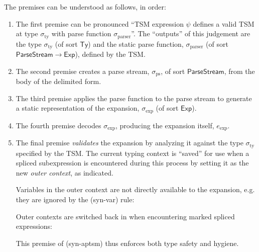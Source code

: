 The premises can be understood as follows, in order:
\begin{enumerate}
\item The first premise can be pronounced ``TSM expression $\psi$ defines a valid TSM at type $\sigma_\text{ty}$ with parse function $\sigma_\text{parser}$''.  The ``outputs'' of this judgement are the type $\sigma_\text{ty}$ (of sort $\mathsf{Ty}$) and the static parse function, $\sigma_\text{parser}$ (of sort $\mathsf{ParseStream} \rightarrow \mathsf{Exp}$), defined by the TSM.%
\item The second premise creates a parse stream, $\sigma_\text{ps}$, of sort $\mathsf{ParseStream}$, from the body of the delimited form.
\item The third premise applies the parse function to the parse stream to generate a static representation of the expansion, $\sigma_\text{exp}$ (of sort $\mathsf{Exp}$).%
\item The fourth premise decodes $\sigma_\text{exp}$, producing the expansion itself, $e_\text{exp}$.
\item The final premise \emph{validates} the expansion by analyzing it against the type $\sigma_\text{ty}$ specified by the TSM. The {current} typing context is ``saved'' for use when a spliced subexpression is encountered during this process by setting it as the new \emph{outer context}, as indicated.

Variables in the outer context are not directly available to the expansion, e.g. they are ignored by the (syn-var) rule:
\begin{mathpar}
\end{mathpar}

Outer contexts are switched back in when encountering marked spliced expressions:
\begin{mathpar}

\end{mathpar}


This premise of (syn-aptsm) thus enforces both type safety and hygiene.

\end{enumerate}
